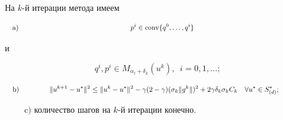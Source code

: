 \begin{lemnonum}


\label{lm:1}


На $k$-й итерации метода имеем





\begin{equation}


\label{eq:7}


\quad\mathrm{a)}\text{\hspace{5.6cm}} p^{i}\in\conv\{q^{0},\dotsc,q^{i}\}


\text{\hspace{5.8cm}}


\end{equation}


и


\begin{equation}


\label{eq:8}


q^{i},p^{i} \in M_{\alpha_{l}+\delta_{k}}(u^{k}),\ \; i=0,1, \dotsc ;


\end{equation}





\begin{equation}


\label{eq:9}


\quad\mathrm{b)}\text{\hspace{1.5cm}}


\| u^{k+1}-u^{*}\| ^{2} \leq \| u^{k}- u^{*}\| ^{2}-


\gamma (2-\gamma )(\sigma _{k} \| g^{k} \| )^{2}


+ 2 \gamma \delta _{k} \sigma _{k} C_{k}


\quad \forall u^{*} \in S^{*}_{(d)};\text{\hspace{1.5cm}}


\end{equation}





\noindent$\qquad\;\mathrm{c)}$ количество шагов на $k$-й итерации конечно.


\end{lemnonum}






